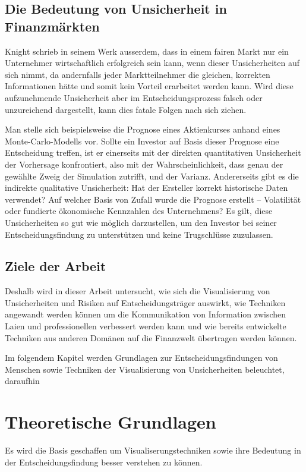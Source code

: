 \subsection{Die Bedeutung von Unsicherheit in Finanzmärkten}
Knight schrieb in seinem Werk ausserdem, dass in einem fairen Markt nur ein Unternehmer wirtschaftlich erfolgreich
sein kann, wenn dieser Unsicherheiten auf sich nimmt, da andernfalls jeder Marktteilnehmer die gleichen, korrekten 
Informationen hätte und somit kein Vorteil erarbeitet werden kann.
Wird diese aufzunehmende Unsicherheit aber im Entscheidungsprozess falsch oder unzureichend dargestellt, kann dies fatale Folgen nach sich 
ziehen. 

Man stelle sich beispielsweise die Prognose eines Aktienkurses anhand eines Monte-Carlo-Modells vor. Sollte ein Investor auf Basis 
dieser Prognose eine Entscheidung treffen, ist er einerseits mit der direkten quantitativen Unsicherheit der Vorhersage konfrontiert, 
also mit der Wahrscheinlichkeit, dass genau der gewählte Zweig der Simulation zutrifft, und der Varianz. Andererseits gibt es die 
indirekte qualitative Unsicherheit: Hat der Ersteller korrekt historische Daten verwendet? \cite{Padilla2021} Auf welcher Basis von Zufall wurde die Prognose erstellt –
Volatilität oder fundierte ökonomische Kennzahlen des Unternehmens? Es gilt, diese Unsicherheiten so gut wie möglich darzustellen, 
um den Investor bei seiner Entscheidungsfindung zu unterstützen und keine Trugschlüsse zuzulassen.

\subsection{Ziele der Arbeit}
Deshalb wird in dieser Arbeit untersucht, wie sich die Visualisierung von Unsicherheiten und Risiken auf Entscheidungsträger auswirkt, wie Techniken angewandt werden können um 
die Kommunikation von Information zwischen Laien und professionellen verbessert werden kann und wie bereits entwickelte Techniken aus anderen Domänen auf die Finanzwelt übertragen werden können.

Im folgendem Kapitel werden Grundlagen zur Entscheidungsfindungen von Menschen sowie Techniken der Visualisierung von Unsicherheiten beleuchtet,
daraufhin


\section{Theoretische Grundlagen}
Es wird die Basis geschaffen um Visualiserungstechniken sowie ihre Bedeutung in der Entscheidungsfindung besser verstehen zu können.

